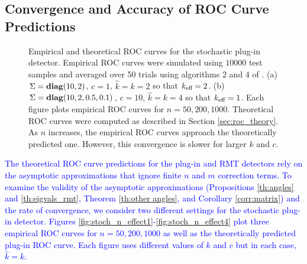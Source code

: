 \subsection{Convergence and Accuracy of ROC Curve Predictions}
\begin{figure}[t]
\centering
{}
\vspace{-0.1in}
\caption{Empirical and theoretical ROC curves for the stochastic plug-in detector. Empirical ROC curves were simulated using $10000$ test samples and averaged over 50 trials using algorithms 2 and 4 of \cite{fawcett2006introduction}. (a) $\Sigma=\mathop{\bf diag}(10,2)$, $c=1$, $\widehat{k}=k=2$ so that $k_\text{eff}=2$. (b) $\Sigma=\mathop{\bf diag}(10,2,0.5,0.1)$, $c=10$, $\widehat{k}=k=4$ so that $k_\text{eff}=1$. Each figure plots empirical ROC curves for $n=50,200,1000$. Theoretical ROC curves were computed as described in Section \ref{sec:roc_theory}. As $n$ increases, the empirical ROC curves approach the theoretically predicted one. However, this convergence is slower for larger $k$ and $c$.}
\vspace{-0.3in}
\end{figure}

\textcolor{blue}{The theoretical ROC curve predictions for the plug-in and RMT detectors rely on the asymptotic approximations that ignore finite $n$ and $m$ correction terms. To examine the validity of the asymptotic approximations (Propositions \ref{th:angles} and \ref{th:eigvals_rmt}, Theorem \ref{th:other angles}, and Corollary \ref{corr:matrix}) and the rate of convergence, we consider two different settings for the stochastic plug-in detector. Figures \ref{fig:stoch_n_effect1}-\ref{fig:stoch_n_effect4} plot three empirical ROC curves for $n=50,200,1000$ as well as the theoretically predicted plug-in ROC curve. Each figure uses different values of $k$ and $c$ but in each case, $\widehat{k}=k$.}

